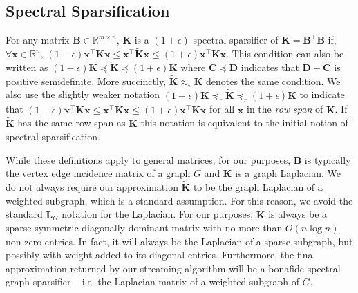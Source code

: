 \documentclass[11pt]{article}
\newcommand{\bv}[1]{\mathbf{#1}}
\begin{document}
\subsection{Spectral Sparsification}
For any matrix $\bv{B} \in \mathbb{R}^{m \times n}$, $\bv{\tilde K}$ is a $(1 \pm \epsilon)$ spectral sparsifier of $\bv{K} = \bv{B}^\top\bv{B}$ if, $\forall \bv{x} \in \mathbb{R}^n$, $(1-\epsilon) \bv{x}^\top \bv{K} \bv{x} \le \bv{x}^\top \bv{\tilde K} \bv{x} \le (1+\epsilon)\bv{x}^\top \bv{K} \bv{x}$. This condition can also be written as $(1-\epsilon)\bv{K} \preceq \bv{\tilde K} \preceq (1+\epsilon)\bv{K}$ where $\bv{C} \preceq \bv{D}$ indicates that $\bv{D} - \bv{C}$ is positive semidefinite. More succinctly, $\bv{\tilde K} \approx_\epsilon \bv{K}$ denotes the same condition. 
We also use the slightly weaker notation $(1-\epsilon)\bv{K} \preceq_{r} \bv{\tilde K} \preceq_r (1+\epsilon)\bv{K}$ to indicate that $(1-\epsilon) \bv{x}^\top \bv{K} \bv{x} \le \bv{x}^\top \bv{\tilde K} \bv{x} \le (1+\epsilon)\bv{x}^\top \bv{K} \bv{x}$ for all $\bv{x}$ in the \emph{row span} of $\bv{K}$. If $\bv{\tilde K}$ has the same row span as $\bv{K}$ this notation is equivalent to the initial notion of spectral sparsification.

While these definitions apply to general matrices, for our purposes, $\bv{B}$ is typically the vertex edge incidence matrix of a graph $G$ and $\bv{K}$ is a graph Laplacian. We do not always require our approximation $\bv{\tilde K}$ to be the graph Laplacian of a weighted subgraph, which is a standard assumption. For this reason, we avoid the standard $\bv{L}_G$ notation for the Laplacian.  For our purposes, $\bv{\tilde K}$ is always be a sparse symmetric diagonally dominant matrix with no more than $O(n\log{n})$ non-zero entries. In fact, it will always be the Laplacian of a sparse subgraph, but possibly with weight added to its diagonal entries. Furthermore, the final approximation returned by our streaming algorithm will be a bonafide spectral graph sparsifier -- i.e. the Laplacian matrix of a weighted subgraph of $G$.
\end{document}
